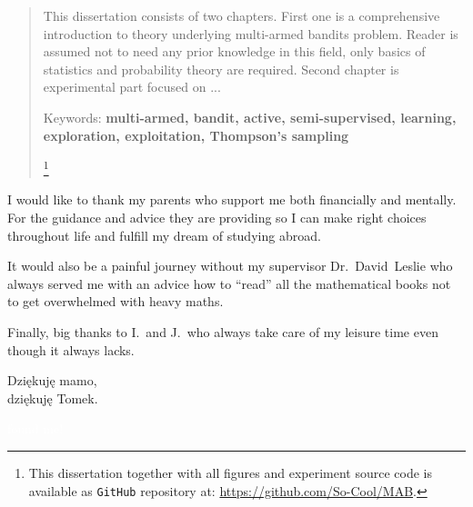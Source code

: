 \documentclass[12pt, a4paper, pdflatex, leqno]{report}
\newenvironment{dedication}
  {\clearpage           %
   \thispagestyle{empty}%
   \vspace*{\stretch{1}}%
   \itshape             %
   \raggedright          %
   \par\setlength{\leftskip}{0.3\textwidth}\noindent\ignorespaces
  }
  {\par %
   \vspace{\stretch{3}} %
   \clearpage           %
  }
\begin{document}
\begin{abstract}
\thispagestyle{empty}%
This dissertation consists of two chapters. First one is a comprehensive introduction to theory underlying multi-armed bandits problem. Reader is assumed not to need any prior knowledge in this field, only basics of statistics and probability theory are required. Second chapter is experimental part focused on ...
\begin{center}
Keywords: \textbf{multi-armed, bandit, active, semi-supervised, learning, exploration, exploitation, Thompson's sampling}

\let\thefootnote\relax\footnote{This dissertation together with all figures and experiment source code is available as \texttt{GitHub} repository at: \url{https://github.com/So-Cool/MAB}.}

\end{center}
\end{abstract}

\begin{dedication}
I would like to thank my parents who support me both financially and mentally. For the guidance and advice they are providing so I can make right choices throughout life and fulfill my dream of studying abroad.\newline

It would also be a painful journey without my supervisor Dr.~David~Leslie who always served me with an advice how to ``read'' all the mathematical books not to get overwhelmed with heavy maths.\newline

Finally, big thanks to I.\ and J.\ who always take care of my leisure time even though it always lacks.\\[2cm]


\begin{flushright}
Dzi\k{e}kuj\k{e} mamo,\\
dzi\k{e}kuj\k{e} Tomek.
\end{flushright}



\textcolor{white}{found me!}



\end{dedication}


\newpage
\tableofcontents
\thispagestyle{empty}
\cleardoublepage
\pagestyle{plain}
\setcounter{page}{1}
\end{document}
